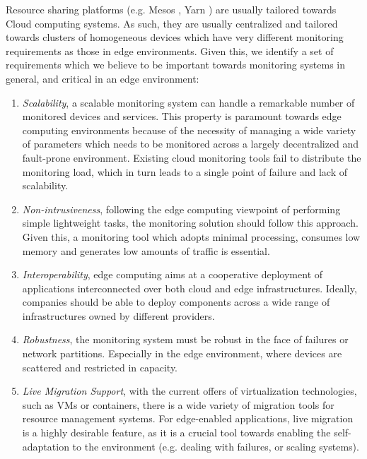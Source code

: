 Resource sharing platforms (e.g. Mesos \cite{hindman2011mesos}, Yarn \cite{Vavilapalli2013ApacheHY}) are usually tailored towards Cloud computing systems. As such, they are usually centralized and tailored towards clusters of homogeneous devices which have very different monitoring requirements as those in edge environments. Given this, we identify a set of requirements which we believe to be important towards monitoring systems in general, and critical in an edge environment:

\begin{enumerate}

    \item  \textit{Scalability}, a scalable monitoring system can handle a remarkable number of monitored devices and services. This property is paramount towards edge computing environments because of the necessity of managing a wide variety of parameters which needs to be monitored across a largely decentralized and fault-prone environment. Existing cloud monitoring tools fail to distribute the monitoring load, which in turn leads to a single point of failure and lack of scalability.

    \item  \textit{Non-intrusiveness}, following the edge computing viewpoint of performing simple lightweight tasks, the monitoring solution should follow this approach. Given this, a monitoring tool which adopts minimal processing, consumes low memory and generates low amounts of traffic is essential.

    \item  \textit{Interoperability}, edge computing aims at a cooperative deployment of applications interconnected over both cloud and edge infrastructures. Ideally, companies should be able to deploy components across a wide range of infrastructures owned by different providers.

    \item \textit{Robustness}, the monitoring system must be robust in the face of failures or network partitions. Especially in the edge environment, where devices are scattered and restricted in capacity. 
    
    \item \textit{Live Migration Support}, with the current offers of virtualization technologies, such as VMs or containers, there is a wide variety of migration tools for resource management systems. For edge-enabled applications, live migration is a highly desirable feature, as it is a crucial tool towards enabling the self-adaptation to the environment (e.g. dealing with failures, or scaling systems).

\end{enumerate}

